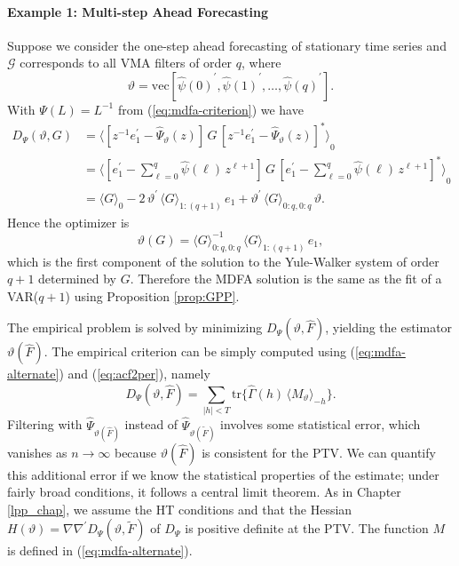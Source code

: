 \documentclass[a4paper]{book}
\def\tends{\rightarrow}
\begin{document}
\paragraph{Example 1: Multi-step Ahead Forecasting}
  Suppose we consider the   one-step ahead forecasting of stationary time series and
 $\mathcal{G} $ corresponds to   all VMA filters of   order $q$, where  
\[
 \vartheta  = \mbox{vec} [{\widehat{\psi} (0) }^{\prime}, {\widehat{\psi} (1) }^{\prime},   \ldots,
  {\widehat{\psi} (q) }^{\prime} ].
\]
 With $\Psi (L) = L^{-1}$ from (\ref{eq:mdfa-criterion}) we
 have 
\begin{align*}
 D_{\Psi} (\vartheta, G) & = 
 { \langle  \left[ z^{-1} e_1^{\prime} -  \widehat{\Psi}_{\vartheta} (z) \right] \,   G \,
  {  \left[ z^{-1} e_1^{\prime} -  \widehat{\Psi}_{\vartheta} (z) \right] }^{*} \rangle }_0 \\
 & = { \langle  \left[ e_1^{\prime} -  \sum_{\ell = 0}^q \widehat{\psi} (\ell) \, z^{\ell+1} \right] \, 
  G \,   {  \left[ e_1^{\prime} -   \sum_{\ell = 0}^q \widehat{\psi} (\ell) \, z^{\ell+1} \right]
  }^{*} \rangle }_0 \\
 & = { \langle G \rangle }_0 - 2 \, \vartheta^{\prime} \, { \langle G \rangle }_{1:(q+1)} \, e_1
   + \vartheta^{\prime} \, { \langle G \rangle }_{0:q,0:q} \, \vartheta.
\end{align*}
 Hence the  optimizer is 
\[
 \vartheta (G) = { \langle G \rangle }_{0:q,0:q}^{-1} \, 
   { \langle G \rangle }_{1:(q+1)} \, e_1,
\]
 which is the first component of the solution to the Yule-Walker system of order $q+1$ determined by $G$.
  Therefore the MDFA solution is the same as the fit of a VAR($q+1$) using 
 Proposition \ref{prop:GPP}.

\vspace{.5cm}

  The empirical problem is solved by minimizing $D_{\Psi} (\vartheta, \widehat{F})$,
 yielding the estimator $\vartheta (\widehat{F})$.  The empirical criterion can be simply 
 computed using (\ref{eq:mdfa-alternate}) and (\ref{eq:acf2per}), namely
\[
   D_{\Psi} (\vartheta, \widehat{F}) = \sum_{|h| < T } \mbox{tr} \{ 
   \widehat{\Gamma} (h) \,  { \langle  M_{\vartheta} \rangle }_{-h} \}.
\] 
Filtering with  $\widehat{\Psi}_{\vartheta (\widehat{F})}$ instead
 of $\widehat{\Psi}_{\vartheta (\widetilde{F})}$
 involves some statistical error, which vanishes as $n \tends \infty$ because
  $\vartheta (  \widehat{F})$ is consistent for the PTV.  We can quantify this additional 
 error if we know the statistical properties of the estimate; under fairly broad conditions,
 it follows a central limit theorem.  As in Chapter \ref{lpp_chap}, we assume 
  the HT conditions and that   the  Hessian  $H(\vartheta) = \nabla \nabla^{\prime}
  D_{\Psi} (\vartheta, \widetilde{F}) $  of $D_{\Psi} $ is positive definite at the PTV.
  The function $M$ is defined in (\ref{eq:mdfa-alternate}).
\end{document}
